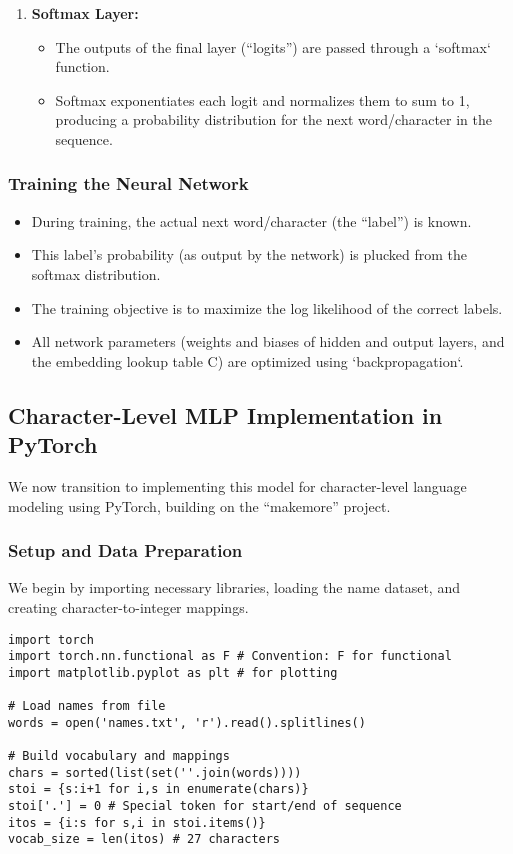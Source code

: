 \begin{enumerate}
    \item \textbf{Softmax Layer:}
    \begin{itemize}
        \item The outputs of the final layer (``logits'') are passed through a `softmax` function.
        \item Softmax exponentiates each logit and normalizes them to sum to 1, producing a probability distribution for the next word/character in the sequence.
    \end{itemize}
\end{enumerate}

\subsubsection{Training the Neural Network}
\begin{itemize}
    \item During training, the actual next word/character (the ``label'') is known.
    \item This label's probability (as output by the network) is plucked from the softmax distribution.
    \item The training objective is to maximize the log likelihood of the correct labels.
    \item All network parameters (weights and biases of hidden and output layers, and the embedding lookup table C) are optimized using `backpropagation`.
\end{itemize}

\subsection{Character-Level MLP Implementation in PyTorch}

We now transition to implementing this model for character-level language modeling using PyTorch, building on the ``makemore'' project.

\subsubsection{Setup and Data Preparation}
We begin by importing necessary libraries, loading the name dataset, and creating character-to-integer mappings.

\begin{lstlisting}[caption=Initial Setup]
import torch
import torch.nn.functional as F # Convention: F for functional
import matplotlib.pyplot as plt # for plotting

# Load names from file
words = open('names.txt', 'r').read().splitlines()

# Build vocabulary and mappings
chars = sorted(list(set(''.join(words))))
stoi = {s:i+1 for i,s in enumerate(chars)}
stoi['.'] = 0 # Special token for start/end of sequence
itos = {i:s for s,i in stoi.items()}
vocab_size = len(itos) # 27 characters
\end{lstlisting}

